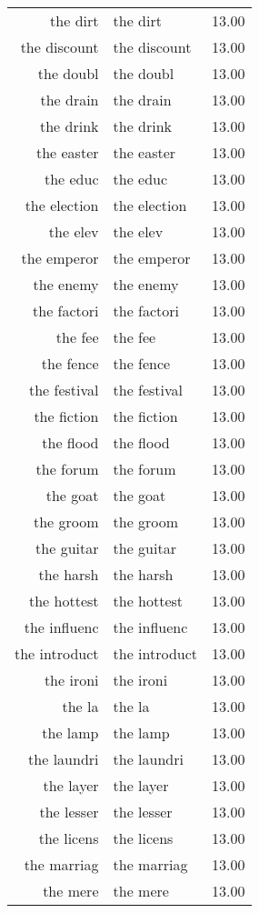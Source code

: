 \begin{table}[ht]
\begin{tabular}{rlr}
  the dirt & the dirt & 13.00 \\ 
  the discount & the discount & 13.00 \\ 
  the doubl & the doubl & 13.00 \\ 
  the drain & the drain & 13.00 \\ 
  the drink & the drink & 13.00 \\ 
  the easter & the easter & 13.00 \\ 
  the educ & the educ & 13.00 \\ 
  the election & the election & 13.00 \\ 
  the elev & the elev & 13.00 \\ 
  the emperor & the emperor & 13.00 \\ 
  the enemy & the enemy & 13.00 \\ 
  the factori & the factori & 13.00 \\ 
  the fee & the fee & 13.00 \\ 
  the fence & the fence & 13.00 \\ 
  the festival & the festival & 13.00 \\ 
  the fiction & the fiction & 13.00 \\ 
  the flood & the flood & 13.00 \\ 
  the forum & the forum & 13.00 \\ 
  the goat & the goat & 13.00 \\ 
  the groom & the groom & 13.00 \\ 
  the guitar & the guitar & 13.00 \\ 
  the harsh & the harsh & 13.00 \\ 
  the hottest & the hottest & 13.00 \\ 
  the influenc & the influenc & 13.00 \\ 
  the introduct & the introduct & 13.00 \\ 
  the ironi & the ironi & 13.00 \\ 
  the la & the la & 13.00 \\ 
  the lamp & the lamp & 13.00 \\ 
  the laundri & the laundri & 13.00 \\ 
  the layer & the layer & 13.00 \\ 
  the lesser & the lesser & 13.00 \\ 
  the licens & the licens & 13.00 \\ 
  the marriag & the marriag & 13.00 \\ 
  the mere & the mere & 13.00 \\ 

\end{tabular}
\end{table}
